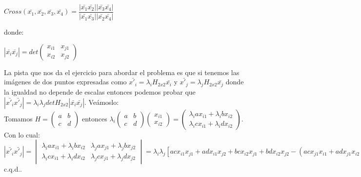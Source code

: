 \documentclass[10pt,a4paper]{article}
\begin{document}
\begin{center}
$Cross(\bar{x_1},\bar{x_2},\bar{x_3},\bar{x_4}) = \dfrac{|\bar{x_1}\bar{x_2}||\bar{x_3}\bar{x_4}|}{|\bar{x_1}\bar{x_3}||\bar{x_2}\bar{x_4}|}$
\end{center}

donde:\\

\begin{center}
$|\bar{x_i}\bar{x_j}|=det\begin{pmatrix}
x_{i1}&x_{j1}\\
x_{i2}&x_{j2}
\end{pmatrix}
$
\end{center}

La pista que nos da el ejercicio para abordar el problema es que si tenemos las imágenes de dos puntos expresadas como $\bar{x'_i}=\lambda_iH_{2x2}\bar{x_i}$ y $\bar{x'_j}=\lambda_jH_{2x2}\bar{x_j}$ donde la igualdad no depende de escalas entonces podemos probar que $|\bar{x'_i}\bar{x'_j}| = \lambda_i\lambda_jdetH_{2x2}|\bar{x_i}\bar{x_j}|$. Veámoslo:\\

Tomamos $H = \begin{pmatrix} a&b\\c&d\end{pmatrix}$ entonces $\lambda_i\begin{pmatrix} a&b\\c&d\end{pmatrix}\begin{pmatrix}x_{i1}\\x_{i2}\end{pmatrix} = \begin{pmatrix} \lambda_iax_{i1}+\lambda_ibx_{i2}\\\lambda_icx_{i1}+\lambda_idx_{i2}\end{pmatrix}$. Con lo cual:\\

$|\bar{x'_i}\bar{x'_j}| = \begin{vmatrix}
\lambda_iax_{i1}+\lambda_ibx_{i2}&\lambda_jax_{j1}+\lambda_jbx_{j2}\\
\lambda_icx_{i1}+\lambda_idx_{i2}&\lambda_jcx_{j1}+\lambda_jdx_{j2}
\end{vmatrix} = \lambda_i\lambda_j[acx_{i1}x_{j1}+adx_{i1}x_{j2}+bcx_{i2}x_{j1}+
bdx_{i2}x_{j2}-(acx_{j1}x_{i1}+adx_{j1}x_{i2}+bcx_{i1}x_{j2}+bdx_{i2}x_{j2})]=
\lambda_i\lambda_j[(ad-bc)(x_{i1}x_{j2})+(bc-ad)(x_{i2}x_{j1})]=\lambda_i\lambda_j[(ad-bc)(x_{i1}x_{j2}-x_{i2}x_{j1})]=\lambda_i\lambda_jdetH_{2x2}|\bar{x_i}\bar{x_j}|$ c.q.d..\\
\end{document}
